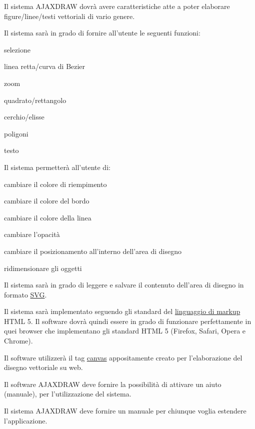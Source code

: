\newpage


\begin{elenconumerato}{\subsecindent}
\item Il sistema AJAXDRAW dovr\`a avere caratteristiche atte a poter elaborare figure/linee/testi vettoriali di vario genere.
\item Il sistema sar\`a in grado di fornire all'utente le seguenti funzioni:

\begin{list}{-}{}
\item selezione
\item linea retta/curva di Bezier
\item zoom
\item quadrato/rettangolo
\item cerchio/elisse
\item poligoni
\item testo
\end{list}

\item Il sistema permetter\`a all'utente di:

\begin{list}{-}{}
\item cambiare il colore di riempimento
\item cambiare il colore del bordo
\item cambiare il colore della linea
\item cambiare l'opacit\`a
\item cambiare il posizionamento all'interno dell'area di disegno
\item ridimensionare gli oggetti
\end{list}

\item Il sistema sar\`a in grado di leggere e salvare il contenuto dell'area di disegno in formato \underline{SVG}.
\item Il sistema sar\`a implementato seguendo gli standard del \underline{linguaggio di markup} HTML 5. Il software dovr\`a quindi essere in grado di funzionare perfettamente in quei browser che implementano gli standard HTML 5 (Firefox, Safari, Opera e Chrome). 
\item Il software utilizzer\`a il tag \underline{canvas} appositamente creato per l'elaborazione del disegno vettoriale su web.
\item Il software AJAXDRAW deve fornire la possibilit\`a di attivare un aiuto (manuale), per l'utilizzazione del sistema. 
\item Il sistema AJAXDRAW deve fornire un manuale per chiunque voglia estendere l'applicazione. 
\end{elenconumerato}

